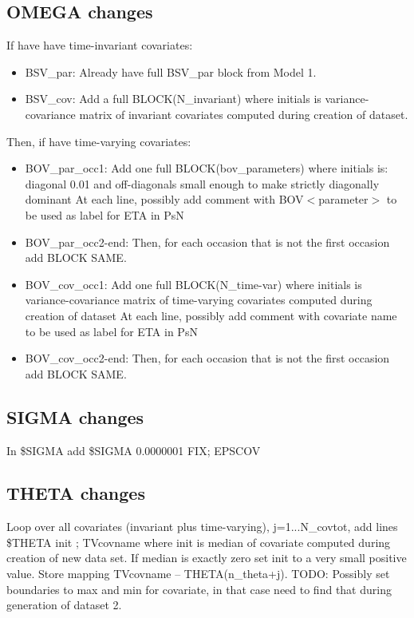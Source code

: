 \subsection{OMEGA changes}
If have have time-invariant covariates:
\begin{itemize}
\item BSV\_par: Already have full BSV\_par block from Model 1.
\item BSV\_cov: Add a full BLOCK(N\_invariant) where initials is variance-covariance matrix of invariant covariates computed during creation of dataset.
\end{itemize}
\noindent 
Then, if have time-varying covariates:
\begin{itemize}
\item BOV\_par\_occ1: Add one full BLOCK(bov\_parameters) where initials is: diagonal 0.01 and off-diagonals small enough to make strictly diagonally dominant
At each line, possibly add comment with BOV$<$parameter$>$ to be used as label for ETA in PsN
\item BOV\_par\_occ2-end: Then, for each occasion that is not the first occasion add BLOCK SAME.
\item BOV\_cov\_occ1: Add one full BLOCK(N\_time-var) where initials is variance-covariance matrix of time-varying covariates computed during creation of dataset
At each line, possibly add comment with covariate name to be used as label for ETA in PsN
\item BOV\_cov\_occ2-end: Then, for each occasion that is not the first occasion add BLOCK SAME.
\end{itemize}
\subsection{SIGMA changes}
In \$SIGMA add 
\$SIGMA 0.0000001 FIX; EPSCOV

\subsection{THETA changes}
Loop over all covariates (invariant plus time-varying), j=1...N\_covtot, add lines
\$THETA init ; TVcovname
where init is median of covariate computed during creation of new data set. If median is exactly zero set
init to a very small positive value. 
Store mapping TVcovname – THETA(n\_theta+j). 
TODO: Possibly set boundaries to max and min for covariate, in that case need to find that during generation of dataset 2.

